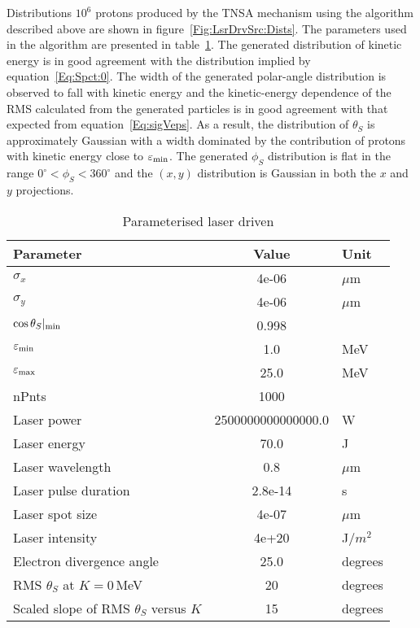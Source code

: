 Distributions $10^6$ protons produced by the TNSA mechanism using the
algorithm described above are shown in
figure~\ref{Fig:LsrDrvSrc:Dists}.
The parameters used in the algorithm are presented in
table~\ref{Tab:Src:Param}.
The generated distribution of kinetic energy is in good agreement with
the distribution implied by equation~\ref{Eq:Spct:0}.
The width of the generated polar-angle distribution is observed to
fall with kinetic energy and the kinetic-energy dependence of the RMS
calculated from the generated particles is in good agreement with that
expected from equation~\ref{Eq:sigVeps}.
As a result, the distribution of $\theta_S$ is approximately Gaussian
with a width dominated by the contribution of protons with kinetic
energy close to $\varepsilon_{\rm min}$.
The generated $\phi_S$ distribution is flat in the range
$0^\circ < \phi_S < 360^\circ$ and the $(x, y)$ distribution is
Gaussian in both the $x$ and $y$ projections.
\begin{table}
  \caption{Parameterised laser driven}
  \label{Tab:Src:Param}
  \begin{center}
    \begin{tabular}{|l|c|l|}
      \hline
        \textbf{Parameter} & \textbf{Value} & \textbf{Unit} \\ 
        \hline
        $\sigma_x$&4e-06&$\mu$m \\ 
        $\sigma_y$&4e-06&$\mu$m \\ 
        $\cos\theta_S |_{\rm min}$&0.998& \\ 
        $\varepsilon_{\rm min}$&1.0&MeV \\ 
        $\varepsilon_{\rm max}$&25.0&MeV \\ 
        nPnts&1000& \\ 
        Laser power&2500000000000000.0&W \\ 
        Laser energy&70.0&J \\ 
        Laser wavelength&0.8&$\mu$m \\ 
        Laser pulse duration&2.8e-14&s \\ 
        Laser spot size&4e-07&$\mu$m \\ 
        Laser intensity&4e+20&J$/m^2$ \\ 
        Electron divergence angle&25.0&degrees \\
        RMS $\theta_S$ at $K=0$\,MeV & 20 & degrees \\
        Scaled slope of RMS $\theta_S$ versus $K$ & 15 & degrees \\
      \hline
    \end{tabular}
  \end{center}
\end{table}
